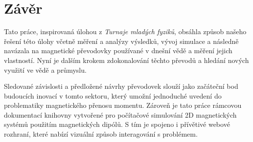 \chapter{Závěr}

Tato práce, inspirovaná úlohou z \textit{Turnaje mladých fyziků}, obsáhla způsob našeho řešení této úlohy včetně měření a analýzy výsledků, vývoj simulace a následně navázala na magnetické převodovky používané v dnešní vědě a měření jejich vlastností. Nyní je dalším krokem zdokonalování těchto převodů a hledání nových využití ve vědě a průmyslu.

Sledované závislosti a předložené návrhy převodovek slouží jako začáteční bod budoucích inovací v tomto sektoru, který umožní jednoduché uvedení do problematiky magnetického přenosu momentu. Zároveň je tato práce rámcovou dokumentací knihovny vytvořené pro počítačové simulování 2D magnetických systémů použitím magnetických dipólů. S tím je spojeno i přívětivé webové rozhraní, které nabízí vizuální způsob interagování s problémem.